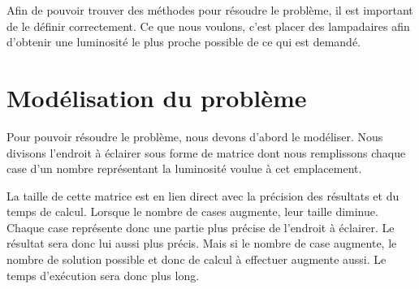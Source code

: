 Afin de pouvoir trouver des m\'{e}thodes pour r\'{e}soudre le probl\`{e}me, il est important de le d\'{e}finir correctement. Ce que nous voulons, c'est placer des lampadaires afin d'obtenir une luminosit\'{e} le plus proche possible de ce qui est demand\'{e}.

\section{Mod\'{e}lisation du probl\`{e}me}
Pour pouvoir r\'{e}soudre le probl\`{e}me, nous devons d'abord le mod\'{e}liser.  Nous divisons l'endroit \`{a} \'{e}clairer sous forme de matrice dont nous remplissons chaque case d'un nombre repr\'{e}sentant la luminosit\'{e} voulue \`{a} cet emplacement.

La taille de cette matrice est en lien direct avec la pr\'{e}cision des r\'{e}sultats et du temps de calcul. Lorsque le nombre de cases augmente, leur taille diminue. Chaque case repr\'{e}sente donc une partie plus pr\'{e}cise de l'endroit \`{a} \'{e}clairer. Le r\'{e}sultat sera donc lui aussi plus pr\'{e}cis. Mais si le nombre de case augmente, le nombre de solution possible et donc de calcul \`{a} effectuer augmente aussi. Le temps d'ex\'{e}cution sera donc plus long.
